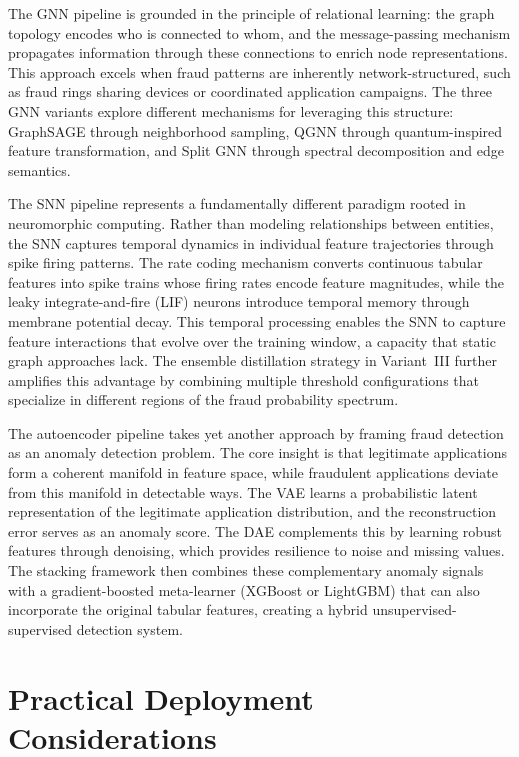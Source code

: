 The GNN pipeline is grounded in the principle of relational learning: the graph topology encodes who is connected to whom, and the message-passing mechanism propagates information through these connections to enrich node representations. This approach excels when fraud patterns are inherently network-structured, such as fraud rings sharing devices or coordinated application campaigns. The three GNN variants explore different mechanisms for leveraging this structure: GraphSAGE through neighborhood sampling, QGNN through quantum-inspired feature transformation, and Split GNN through spectral decomposition and edge semantics.

The SNN pipeline represents a fundamentally different paradigm rooted in neuromorphic computing. Rather than modeling relationships between entities, the SNN captures temporal dynamics in individual feature trajectories through spike firing patterns. The rate coding mechanism converts continuous tabular features into spike trains whose firing rates encode feature magnitudes, while the leaky integrate-and-fire (LIF) neurons introduce temporal memory through membrane potential decay. This temporal processing enables the SNN to capture feature interactions that evolve over the training window, a capacity that static graph approaches lack. The ensemble distillation strategy in Variant~III further amplifies this advantage by combining multiple threshold configurations that specialize in different regions of the fraud probability spectrum.

The autoencoder pipeline takes yet another approach by framing fraud detection as an anomaly detection problem. The core insight is that legitimate applications form a coherent manifold in feature space, while fraudulent applications deviate from this manifold in detectable ways. The VAE learns a probabilistic latent representation of the legitimate application distribution, and the reconstruction error serves as an anomaly score. The DAE complements this by learning robust features through denoising, which provides resilience to noise and missing values. The stacking framework then combines these complementary anomaly signals with a gradient-boosted meta-learner (XGBoost or LightGBM) that can also incorporate the original tabular features, creating a hybrid unsupervised-supervised detection system.

\section{Practical Deployment Considerations}

